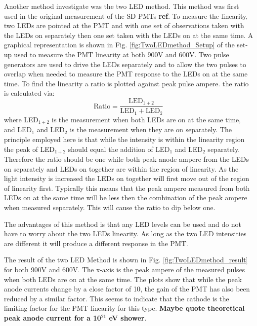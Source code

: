 Another method investigate was the two LED method. This method was first used in the original measurement of the SD PMTs \textbf{ref}. To measure the linearity, two LEDs are pointed at the PMT and with one set of observations taken with the LEDs on separately then one set taken with the LEDs on at the same time. A graphical representation is shown in Fig. \ref{fig:TwoLEDmethod_Setup} of the set-up used to measure the PMT linearity at both 900V and 600V. Two pulse generators are used to drive the LEDs separately and to allow the two pulses to overlap when needed to measure the PMT response to the LEDs on at the same time. To find the linearity a ratio is plotted against peak pulse ampere. the ratio is calculated via:
\begin{equation}
\mathrm{Ratio} = \frac{\mathrm{LED}_{1+2}}{\mathrm{LED}_{1} + \mathrm{LED}_{2}}
\end{equation}
where LED$_{1+2}$ is the measurement when both LEDs are on at the same time, and LED$_{1}$ and LED$_2$ is the measurement when they are on separately. The principle employed here is that while the intensity is within the linearity region the peak of LED$_{1+2}$ should equal the addition of LED$_{1}$ and LED$_2$ separately. Therefore the ratio should be one while both peak anode ampere from the LEDs on separately and LEDs on together are within the region of linearity. As the light intensity is increased the LEDs on together will first move out of the region of linearity first. Typically this means that the peak ampere measured from both LEDs on at the same time will be less then the combination of the peak ampere when measured separately. This will cause the ratio to dip below one.

The advantages of this method is that any LED levels can be used and do not have to worry about the two LEDs linearity. As long as the two LED intensities are different it will produce a different response in the PMT. 

The result of the two LED Method is shown in Fig. \ref{fig:TwoLEDmethod_result} for both 900V and 600V. The x-axis is the peak ampere of the measured pulses when both LEDs are on at the same time. The plots show that while the peak anode currents change by a close factor of 10, the gain of the PMT has also been reduced by a similar factor. This seems to indicate that the cathode is the limiting factor for the PMT linearity for this type. \textbf{Maybe quote theoretical peak anode current for a 10$^{21}$ eV shower}.

